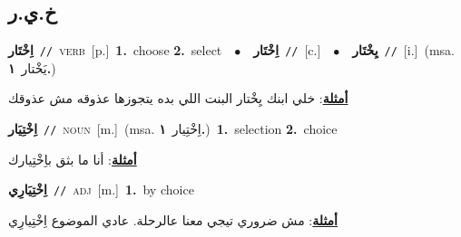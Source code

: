 \documentclass[10pt,a4paper,twoside]{article} %
\begin{document}
\begin{multicols}{2}
\vspace{-3mm}
\subsection*{\color{blue}\foreignlanguage{arabic}{خ.ي.ر}\color{blue}{}} 

{\setlength\topsep{0pt}\textbf{\foreignlanguage{arabic}{اِخْتَار}}\ {\color{gray}\texttt{//}\color{black}}\ \textsc{verb}\ [p.]\ \textbf{1.}~choose  \textbf{2.}~select\ \ $\bullet$\ \ \setlength\topsep{0pt}\textbf{\foreignlanguage{arabic}{اِخْتَار}}\ {\color{gray}\texttt{//}\color{black}}\ [c.]\ \ $\bullet$\ \ \setlength\topsep{0pt}\textbf{\foreignlanguage{arabic}{يِخْتَار}}\ {\color{gray}\texttt{//}\color{black}}\ [i.]\ \color{gray}(msa. \foreignlanguage{arabic}{يَخْتار}~\foreignlanguage{arabic}{\textbf{١.}})\color{black}\  \begin{flushright}\color{gray}\foreignlanguage{arabic}{\textbf{\underline{\foreignlanguage{arabic}{أمثلة}}}: خلي ابنك يِخْتار البنت اللي بده يتجوزها عذوقه مش عذوقك}\end{flushright}\color{black}} \vspace{2mm}

{\setlength\topsep{0pt}\textbf{\foreignlanguage{arabic}{اِخْتِيَار}}\ {\color{gray}\texttt{//}\color{black}}\ \textsc{noun}\ [m.]\ \color{gray}(msa. \foreignlanguage{arabic}{اِخْتِيار}~\foreignlanguage{arabic}{\textbf{١.}})\color{black}\ \textbf{1.}~selection  \textbf{2.}~choice\  \begin{flushright}\color{gray}\foreignlanguage{arabic}{\textbf{\underline{\foreignlanguage{arabic}{أمثلة}}}: أنا ما بثق باِخْتِيارك}\end{flushright}\color{black}} \vspace{2mm}

{\setlength\topsep{0pt}\textbf{\foreignlanguage{arabic}{اِخْتِيَارِي}}\ {\color{gray}\texttt{//}\color{black}}\ \textsc{adj}\ [m.]\ \textbf{1.}~by choice\  \begin{flushright}\color{gray}\foreignlanguage{arabic}{\textbf{\underline{\foreignlanguage{arabic}{أمثلة}}}: مش ضروري تيجي معنا عالرحلة. عادي الموضوع اِخْتِيارِي}\end{flushright}\color{black}} \vspace{2mm}


\end{multicols}
\end{document}
